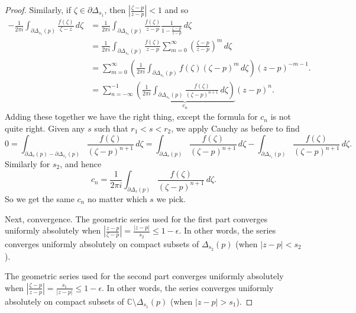 \documentclass[12pt,openany]{book}
\newcommand{\sabs}[1]{\lvert {#1} \rvert}
\newcommand{\abs}[1]{\left\lvert {#1} \right\rvert}
\newcommand{\C}{{\mathbb{C}}}
\theoremstyle{plain}
\theoremstyle{remark}
\theoremstyle{definition}
\theoremstyle{exercise}
\theoremstyle{example}
\begin{document}
\begin{proof}
Similarly, 
if $\zeta \in \partial \Delta_{s_1}$, then
$\abs{\frac{\zeta-p}{z-p}} < 1$ and so
\begin{equation*}
\begin{split}
-\frac{1}{2\pi i}
\int_{\partial \Delta_{s_1}(p)} \frac{f(\zeta)}{\zeta-z} \, d\zeta 
& = 
\frac{1}{2\pi i}
\int_{\partial \Delta_{s_1}(p)} \frac{f(\zeta)}{z-p}
\frac{1}{1-\frac{\zeta-p}{z-p}} \, d\zeta
\\
& =
\frac{1}{2\pi i}
\int_{\partial \Delta_{s_1}(p)} \frac{f(\zeta)}{z-p}
\sum_{m=0}^\infty
{\left(\frac{\zeta-p}{z-p}\right)}^m \, d\zeta
\\
& =
\sum_{m=0}^\infty
\left(
\frac{1}{2\pi i}
\int_{\partial \Delta_{s_1}(p)} f(\zeta){(\zeta-p)}^{m}
 \, d\zeta
\right)
{(z-p)}^{-m-1} .
\\
& =
\sum_{n=-\infty}^{-1}
\underbrace{
\left(
\frac{1}{2\pi i}
\int_{\partial \Delta_{s_1}(p)} \frac{f(\zeta)}{{(\zeta-p)}^{n+1}}
 \, d\zeta
\right)
}_{c_n}
{(z-p)}^{n} .
\end{split}
\end{equation*}
Adding these together we have the right thing, except the formula for $c_n$
is not quite right.  Given any $s$ such that
$r_1 < s < r_2$, we apply Cauchy as before to find
\begin{equation*}
0 = \int_{\partial \Delta_{s}(p) - \partial \Delta_{s_1}(p)}
\frac{f(\zeta)}{{(\zeta-p)}^{n+1}} \, d\zeta
=
\int_{\partial \Delta_{s}(p)}
\frac{f(\zeta)}{{(\zeta-p)}^{n+1}} \, d\zeta
-
\int_{\partial \Delta_{s_1}(p)}
\frac{f(\zeta)}{{(\zeta-p)}^{n+1}} \, d\zeta .
\end{equation*}
Similarly for $s_2$, and hence
\begin{equation*}
c_n = \frac{1}{2\pi i}
\int_{\partial \Delta_{s}(p)} \frac{f(\zeta)}{{(\zeta-p)}^{n+1}}
 \, d\zeta .
\end{equation*}
So we get the same $c_n$ no matter which $s$ we pick.

Next, convergence.
The geometric series used for the first part converges uniformly
absolutely when $\abs{\frac{z-p}{\zeta-p}} = \frac{\sabs{z-p}}{s_2} \leq
1-\epsilon$.  In other words, the series converges uniformly absolutely
on compact subsets of $\Delta_{s_2}(p)$ (when $\sabs{z-p} < s_2$).

The geometric series used for the second part converges uniformly
absolutely when $\abs{\frac{\zeta-p}{z-p}} = \frac{s_1}{\sabs{z-p}} \leq
1-\epsilon$.  In other words, the series converges uniformly absolutely
on compact subsets of $\C \setminus \Delta_{s_1}(p)$ (when $\sabs{z-p} > s_1$).


\end{proof}
\end{document}
